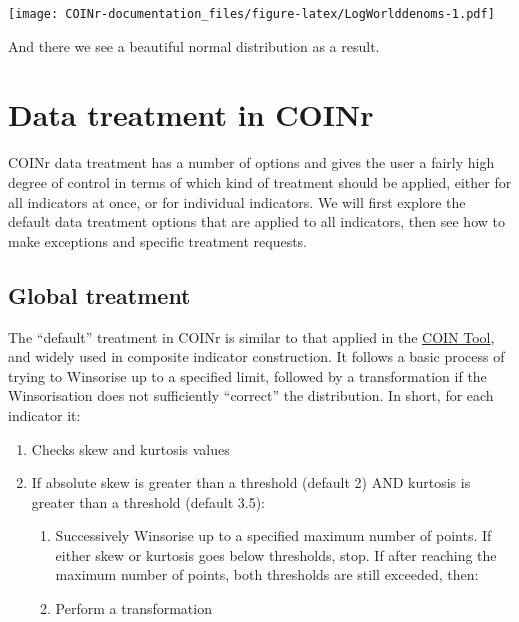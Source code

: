 \documentclass[
]{book}
\providecommand{\tightlist}{%
  \setlength{\itemsep}{0pt}\setlength{\parskip}{0pt}}
\begin{document}
\texttt{[image: COINr-documentation\_files/figure-latex/LogWorlddenoms-1.pdf]}

And there we see a beautiful normal distribution as a result.

\hypertarget{data-treatment-in-coinr}{%
\section{Data treatment in COINr}\label{data-treatment-in-coinr}}

COINr data treatment has a number of options and gives the user a fairly high degree of control in terms of which kind of treatment should be applied, either for all indicators at once, or for individual indicators. We will first explore the default data treatment options that are applied to all indicators, then see how to make exceptions and specific treatment requests.

\hypertarget{global-treatment}{%
\subsection{Global treatment}\label{global-treatment}}

The ``default'' treatment in COINr is similar to that applied in the \href{https://knowledge4policy.ec.europa.eu/composite-indicators/coin-tool_en}{COIN Tool}, and widely used in composite indicator construction. It follows a basic process of trying to Winsorise up to a specified limit, followed by a transformation if the Winsorisation does not sufficiently ``correct'' the distribution. In short, for each indicator it:

\begin{enumerate}
\def\labelenumi{\arabic{enumi}.}
\tightlist
\item
  Checks skew and kurtosis values
\item
  If absolute skew is greater than a threshold (default 2) AND kurtosis is greater than a threshold (default 3.5):

  \begin{enumerate}
  \def\labelenumii{(\alph{enumii})}
  \tightlist
  \item
    Successively Winsorise up to a specified maximum number of points. If either skew or kurtosis goes below thresholds, stop. If after reaching the maximum number of points, both thresholds are still exceeded, then:
  \item
    Perform a transformation
  \end{enumerate}
\end{enumerate}
\end{document}
